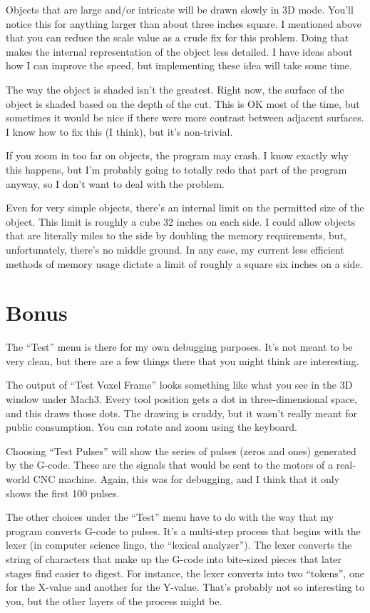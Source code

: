 \documentclass[titlepage,oneside,10pt]{article}
\begin{document}
{Objects that are large and/or intricate will be drawn slowly in 3D mode. You'll
notice this for anything larger than about three inches square. I
mentioned above that you can reduce the scale value as a crude
fix for this problem. Doing that makes the internal representation of the
object less detailed. I have ideas about how I can improve the speed, but
implementing these idea will take some time.

The way the object is shaded isn't the greatest. Right now, the
surface of the object is shaded based on the depth of the cut. This
is OK most of the time, but sometimes it would be nice if there were
more contrast between adjacent surfaces. I know how to fix this (I
think), but it's non-trivial.

If you zoom in too far on objects, the program may crash. I know
exactly why this happens, but I'm probably going to totally redo that
part of the program anyway, so I don't want to deal with the problem.

Even for very simple objects, there's an internal limit on the
permitted size of the object. This limit is roughly a cube 32 inches
on each side. I could allow objects that are literally miles to the side
by doubling the memory requirements, but, unfortunately, there's
no middle ground. In any case, my current less efficient methods of
memory usage dictate a limit of roughly a square six inches on a
side.

\section{Bonus}

The ``Test'' menu is there for my own debugging purposes. It's not
meant to be very clean, but there are a few things there that you
might think are interesting.

The output of ``Test Voxel Frame'' looks something like what you see
in the 3D window under Mach3. Every tool position gets a dot in
three-dimensional space, and this draws those dots. The drawing is
cruddy, but it wasn't really meant for public consumption. You can
rotate and zoom using the keyboard. 

Choosing ``Test Pulses'' will show the series of pulses (zeros and
ones) generated by the G-code. These are the signals that would be sent to the
motors of a real-world CNC machine. Again, this was for debugging, and
I think that it only shows the first 100 pulses.

The other choices under the ``Test'' menu have to do with the way that
my program converts G-code to pulses. It's a multi-step process that
begins with the lexer (in computer science lingo, the ``lexical
analyzer''). The lexer converts the string of 
characters that make up the G-code into bite-sized pieces that later
stages find easier to digest. For instance, the lexer converts 
\vskip 0.10cm
\vskip 0.10cm
\noindent into two ``tokens'', one for the X-value and another for the
Y-value. That's probably not so interesting to you, but the other
layers of the process might be.

}
\end{document}

